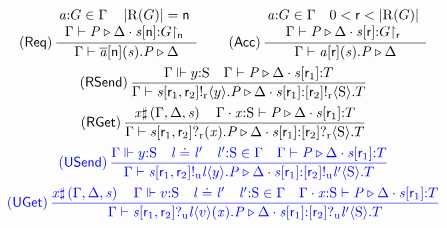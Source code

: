\begin{figure}[tp]
	\centering
	\[ \begin{array}{c}
		\left( \textsf{Req} \right) \dfrac{\!\!\begin{array}{c} \Typed{\Chan[a]}{\GT} \in \Gamma \quad \Length{\Roles{\GT}} = \Role[n] \\ \Gamma \vdash \PT \triangleright \Delta \compS \Typed{\AT{\Chan}{\Role[n]}}{\Proj{\GT}{\Role[n]}} \end{array}}{\Gamma \vdash \PReq{\Chan[a]}{\Role[n]}{\Chan}{\PT} \triangleright \Delta} \hspace{2em}
		\left( \textsf{Acc} \right) \dfrac{\!\!\begin{array}{c} \Typed{\Chan[a]}{\GT} \in \Gamma \quad 0 < \Role < \Length{\Roles{\GT}} \\ \Gamma \vdash \PT \triangleright \Delta \compS \Typed{\AT{\Chan}{\Role}}{\Proj{\GT}{\Role}} \end{array}}{\Gamma \vdash \PAcc{\Chan[a]}{\Role}{\Chan}{\PT} \triangleright \Delta} \vspace{0.5em}\\
		\left( \textsf{RSend} \right) \dfrac{\Gamma \Vdash \Typed{\Expr[y]}{\Sort} \quad \Gamma \vdash \PT \triangleright \Delta \compS \Typed{\AT{\Chan}{\Role_1}}{\LT}}{\Gamma \vdash \PSendR{\Chan}{\Role_1}{\Role_2}{\Expr[y]}{\PT} \triangleright \Delta \compS \Typed{\AT{\Chan}{\Role_1}}{\LSendR{\Role_2}{\Sort}{\LT}}} \vspace{0.5em}\\
		\left( \textsf{RGet} \right) \dfrac{\Args \sharp \left( \Gamma, \Delta, \Chan \right) \quad \Gamma \compS \Typed{\Args}{\Sort} \vdash \PT \triangleright \Delta \compS \Typed{\AT{\Chan[s]}{\Role_1}}{\LT}}{\Gamma \vdash \PGetR{\Chan}{\Role_1}{\Role_2}{\Args}{\PT} \triangleright \Delta \compS \Typed{\AT{\Chan}{\Role_1}}{\LGetR{\Role_2}{\Sort}{\LT}}} \vspace{0.5em}\\
		\textcolor{blue}{\left( \textsf{USend} \right) \dfrac{\Gamma \Vdash \Typed{\Expr[y]}{\Sort} \quad \Label \compL \Label' \quad \Typed{\Label'}{\Sort} \in \Gamma \quad \Gamma \vdash \PT \triangleright \Delta \compS \Typed{\AT{\Chan}{\Role_1}}{\LT}}{\Gamma \vdash \PSendU{\Chan}{\Role_1}{\Role_2}{\Label}{\Expr[y]}{\PT} \triangleright \Delta \compS \Typed{\AT{\Chan}{\Role_1}}{\LSendU{\Role_2}{\Label'}{\Sort}{\LT}}}} \vspace{0.5em}\\
		\textcolor{blue}{\left( \textsf{UGet} \right) \dfrac{\Args \sharp \left( \Gamma, \Delta, \Chan \right) \quad \Gamma \Vdash \Typed{\Expr[v]}{\Sort} \quad \Label \compL \Label' \quad \Typed{\Label'}{\Sort} \in \Gamma \quad \Gamma \compS \Typed{\Args}{\Sort} \vdash \PT \triangleright \Delta \compS \Typed{\AT{\Chan[s]}{\Role_1}}{\LT}}{\Gamma \vdash \PGetU{\Chan}{\Role_1}{\Role_2}{\Label}{\Expr[v]}{\Args}{\PT} \triangleright \Delta \compS \Typed{\AT{\Chan}{\Role_1}}{\LGetU{\Role_2}{\Label'}{\Sort}{\LT}}}} \vspace{0.5em}\\

\end{array}\]
\end{figure}
